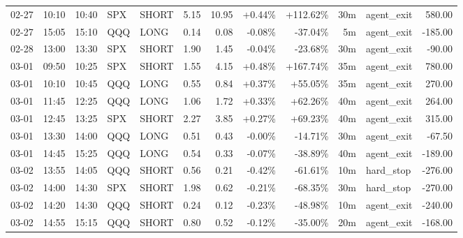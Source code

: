 \documentclass[11pt,a4paper,twoside]{article}
\begin{document}
\begin{center}
\begin{longtable}{>{\color{txtmain}}l l l l l r r r r r >{\color{txtmain}}l r}
02-27 & 10:10 & 10:40 & SPX & SHORT & 5.15 & 10.95 & \textcolor{wingreen}{+0.44\%} & \textcolor{wingreen}{+112.62\%} & 30m & agent\_exit & \textcolor{wingreen}{580.00} \\
02-27 & 15:05 & 15:10 & QQQ & LONG & 0.14 & 0.08 & \textcolor{lossred}{-0.08\%} & \textcolor{lossred}{-37.04\%} & 5m & agent\_exit & \textcolor{lossred}{-185.00} \\
02-28 & 13:00 & 13:30 & SPX & SHORT & 1.90 & 1.45 & \textcolor{lossred}{-0.04\%} & \textcolor{lossred}{-23.68\%} & 30m & agent\_exit & \textcolor{lossred}{-90.00} \\
03-01 & 09:50 & 10:25 & SPX & SHORT & 1.55 & 4.15 & \textcolor{wingreen}{+0.48\%} & \textcolor{wingreen}{+167.74\%} & 35m & agent\_exit & \textcolor{wingreen}{780.00} \\
03-01 & 10:10 & 10:45 & QQQ & LONG & 0.55 & 0.84 & \textcolor{wingreen}{+0.37\%} & \textcolor{wingreen}{+55.05\%} & 35m & agent\_exit & \textcolor{wingreen}{270.00} \\
03-01 & 11:45 & 12:25 & QQQ & LONG & 1.06 & 1.72 & \textcolor{wingreen}{+0.33\%} & \textcolor{wingreen}{+62.26\%} & 40m & agent\_exit & \textcolor{wingreen}{264.00} \\
03-01 & 12:45 & 13:25 & SPX & SHORT & 2.27 & 3.85 & \textcolor{wingreen}{+0.27\%} & \textcolor{wingreen}{+69.23\%} & 40m & agent\_exit & \textcolor{wingreen}{315.00} \\
03-01 & 13:30 & 14:00 & QQQ & LONG & 0.51 & 0.43 & \textcolor{lossred}{-0.00\%} & \textcolor{lossred}{-14.71\%} & 30m & agent\_exit & \textcolor{lossred}{-67.50} \\
03-01 & 14:45 & 15:25 & QQQ & LONG & 0.54 & 0.33 & \textcolor{lossred}{-0.07\%} & \textcolor{lossred}{-38.89\%} & 40m & agent\_exit & \textcolor{lossred}{-189.00} \\
03-02 & 13:55 & 14:05 & QQQ & SHORT & 0.56 & 0.21 & \textcolor{lossred}{-0.42\%} & \textcolor{lossred}{-61.61\%} & 10m & hard\_stop & \textcolor{lossred}{-276.00} \\
03-02 & 14:00 & 14:30 & SPX & SHORT & 1.98 & 0.62 & \textcolor{lossred}{-0.21\%} & \textcolor{lossred}{-68.35\%} & 30m & hard\_stop & \textcolor{lossred}{-270.00} \\
03-02 & 14:20 & 14:30 & QQQ & SHORT & 0.24 & 0.12 & \textcolor{lossred}{-0.23\%} & \textcolor{lossred}{-48.98\%} & 10m & agent\_exit & \textcolor{lossred}{-240.00} \\
03-02 & 14:55 & 15:15 & QQQ & SHORT & 0.80 & 0.52 & \textcolor{lossred}{-0.12\%} & \textcolor{lossred}{-35.00\%} & 20m & agent\_exit & \textcolor{lossred}{-168.00} \\

\end{longtable}
\end{center}
\end{document}
